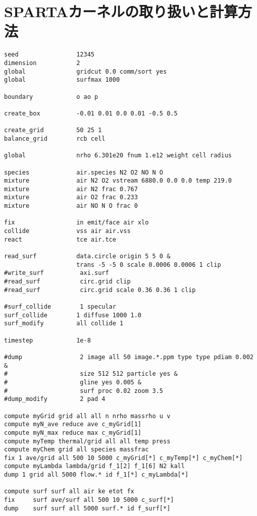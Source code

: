 \chapter{SPARTAカーネルの取り扱いと計算方法}
\label{chap:sparta}

\begin{lstlisting}[caption={SPARTAカーネルの入力ファイル例},label={list:sparta}]
seed                12345
dimension           2
global              gridcut 0.0 comm/sort yes
global              surfmax 1000

boundary            o ao p

create_box          -0.01 0.01 0.0 0.01 -0.5 0.5

create_grid         50 25 1
balance_grid        rcb cell

global              nrho 6.301e20 fnum 1.e12 weight cell radius

species             air.species N2 O2 NO N O
mixture             air N2 O2 vstream 6880.0 0.0 0.0 temp 219.0
mixture             air N2 frac 0.767
mixture             air O2 frac 0.233
mixture             air NO N O frac 0

fix                 in emit/face air xlo
collide             vss air air.vss
react               tce air.tce

read_surf           data.circle origin 5 5 0 &
                    trans -5 -5 0 scale 0.0006 0.0006 1 clip
#write_surf          axi.surf
#read_surf           circ.grid clip
#read_surf           circ.grid scale 0.36 0.36 1 clip

#surf_collide        1 specular
surf_collide        1 diffuse 1000 1.0
surf_modify         all collide 1

timestep            1e-8

#dump                2 image all 50 image.*.ppm type type pdiam 0.002 &
#                    size 512 512 particle yes &
#                    gline yes 0.005 &
#                    surf proc 0.02 zoom 3.5
#dump_modify         2 pad 4 

compute myGrid grid all all n nrho massrho u v
compute myN_ave reduce ave c_myGrid[1]
compute myN_max reduce max c_myGrid[1]
compute myTemp thermal/grid all all temp press
compute myChem grid all species massfrac
fix 1 ave/grid all 500 10 5000 c_myGrid[*] c_myTemp[*] c_myChem[*]
compute myLambda lambda/grid f_1[2] f_1[6] N2 kall
dump 1 grid all 5000 flow.* id f_1[*] c_myLambda[*]

compute surf surf all air ke etot fx
fix     surf ave/surf all 500 10 5000 c_surf[*]
dump    surf surf all 5000 surf.* id f_surf[*]


\end{lstlisting}
